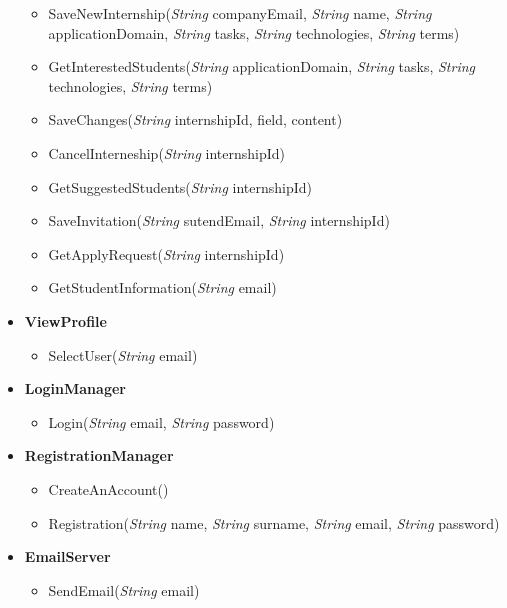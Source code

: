 \begin{itemize}
\begin{itemize}
\item SaveNewInternship(\textit{String} companyEmail, \textit{String} name,  \textit{String} applicationDomain, \textit{String} tasks, \textit{String} technologies, \textit{String}  terms)
\item GetInterestedStudents(\textit{String} applicationDomain, \textit{String} tasks, \textit{String} technologies, \textit{String}  terms)
\item SaveChanges(\textit{String} internshipId, field, content)
\item CancelInterneship(\textit{String} internshipId)
\item GetSuggestedStudents(\textit{String} internshipId)
\item SaveInvitation(\textit{String} sutendEmail, \textit{String} internshipId)
\item GetApplyRequest(\textit{String} internshipId)
\item GetStudentInformation(\textit{String} email)
\end{itemize}


    \item \textbf{\textbf{ViewProfile}}
    \begin{itemize}

\item SelectUser(\textit{String} email)

\end{itemize}


    \item \textbf{\textbf{LoginManager}}
\begin{itemize}
        \item Login(\textit{String} email, \textit{String} password)
\end{itemize}

    \item \textbf{\textbf{RegistrationManager}}
\begin{itemize}
        \item CreateAnAccount()
        \item Registration(\textit{String} name, \textit{String} surname, \textit{String} email, \textit{String} password)
\end{itemize}

    \item \textbf{\textbf{EmailServer}}
\begin{itemize}
        \item SendEmail(\textit{String} email)
\end{itemize}


\end{itemize}
